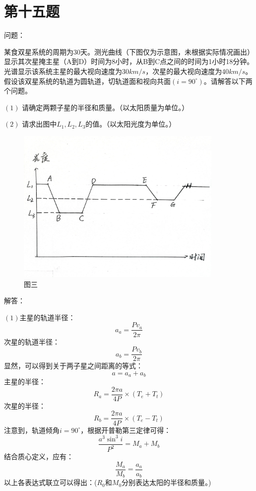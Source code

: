 \documentclass[a4paper,12pt]{report}
\begin{document}
\section{第十五题}
\noindent 问题：

\noindent 某食双星系统的周期为30天。测光曲线（下图仅为示意图，未根据实际情况画出）显示其次星掩主星（A到D）时间为8小时，从B到C点之间的时间为1小时18分钟。光谱显示该系统主星的最大视向速度为30$km/s$，次星的最大视向速度为40$km/s$。假设该双星系统的轨道为圆轨道，切轨道面和视向共面$\left(i=90^\circ\right)$。请解答以下两个问题。

\noindent $\left(1\right)$
请确定两颗子星的半径和质量。（以太阳质量为单位。）

\noindent $\left(2\right)$
请求出图中$L_{1},L_{2},L_{3}$的值。（以太阳光度为单位。）
\begin{figure}[!h]
	\centering
	\includegraphics[width=10cm]{3_15.jpg}
	\caption{图三}
\end{figure}
\noindent 解答：

\noindent $\left(1\right)$主星的轨道半径：
\begin{equation}
	a_{a}=\frac{Pv_{a}}{2\pi}
\end{equation}
次星的轨道半径：
\begin{equation}
	a_{b}=\frac{Pv_{b}}{2\pi}
\end{equation}
显然，可以得到关于两子星之间距离的等式：
\begin{equation}
	a=a_{a}+a_{b}
\end{equation}
主星的半径：
\begin{equation}
	R_{a}=\frac{2\pi a}{4P}\times (T_{e}+T_{t})
\end{equation}
次星的半径：
\begin{equation}
	R_{b}=\frac{2\pi a}{4P}\times (T_{e}-T_{t})
\end{equation}
注意到，轨道倾角$i=90^\circ$，根据开普勒第三定律可得：
\begin{equation}
	\frac{a^3\sin^3 i}{P^2}=M_{a}+M_{b}
\end{equation}
结合质心定义，应有：
\begin{equation}
	\frac{M_{a}}{M_{b}}=\frac{a_{a}}{a_{b}}
\end{equation}
以上各表达式联立可以得出：($R_{0}$和$M_{0}$分别表达太阳的半径和质量。)
\end{document}

